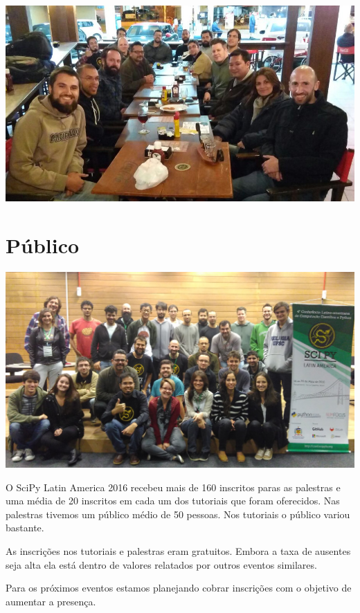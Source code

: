 \documentclass[12pt]{article}
\begin{document}
\noindent  %
\includegraphics[width=\textwidth]{social-viking.jpg}




\newpage

\section*{Público}

\noindent  %
\includegraphics[width=\textwidth]{group.jpg}

O SciPy Latin America 2016 recebeu mais de 160 inscritos paras as palestras e
uma média de 20 inscritos em cada um dos tutoriais que foram oferecidos.
Nas palestras tivemos um público médio de 50 pessoas. Nos tutoriais o público
variou bastante.

As inscrições nos tutoriais e palestras eram gratuitos. Embora a taxa de
ausentes seja alta ela está dentro de valores relatados por outros eventos
similares.

Para os próximos eventos estamos planejando cobrar inscrições com o objetivo de
aumentar a presença.
\end{document}
